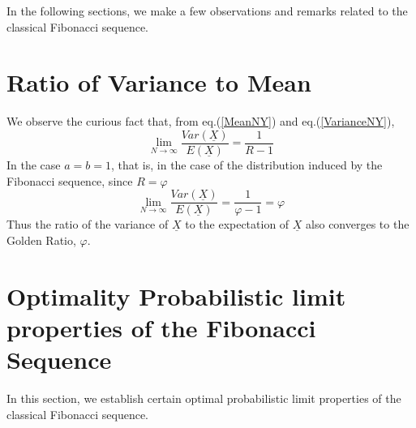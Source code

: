 \begin{multicols}{2}
In the following sections, we make a few observations and remarks related to the classical Fibonacci sequence.

\section{Ratio of Variance to Mean}\label{section-9}
We observe the curious fact that, from eq.(\ref{MeanNY}) and eq.(\ref{VarianceNY}),
\begin{equation}
\lim_{N\rightarrow \infty} \frac{Var(\underline{X})}{E(\underline{X})} = \frac{1}{R-1}\label{eq-9.1}
\end{equation}
In the case $a = b = 1$, that is, in the case of the distribution induced by the Fibonacci sequence, since $R = \varphi$
\begin{equation}
\lim_{N\rightarrow \infty} \frac{Var(\underline{X})}{E(\underline{X})} = \frac{1}{\varphi-1} = \varphi\label{eq-9.2}
\end{equation}
Thus the ratio of the variance of $\underline{X}$ to the expectation of $\underline{X}$ also converges to the Golden Ratio, $\varphi$.

\section{Optimality Probabilistic limit properties of the Fibonacci Sequence}\label{section-10}
In this section, we establish certain optimal probabilistic limit properties of the classical Fibonacci sequence. 


\end{multicols}
